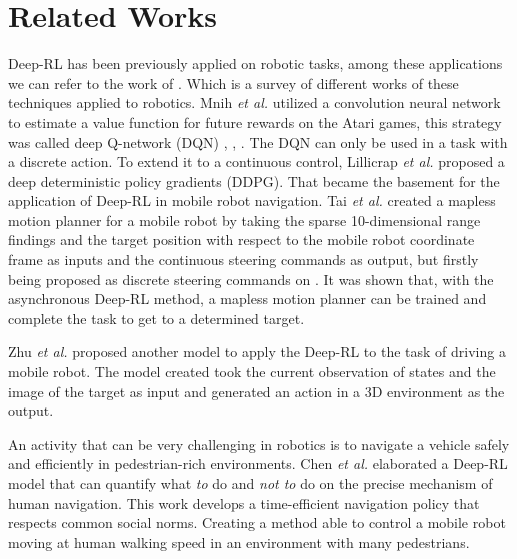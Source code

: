 \section{Related Works}

Deep-RL has been previously applied on robotic tasks, among these applications we can refer to the work of \cite{kober2013reinforcement}.
Which is a survey of different works of these techniques applied to robotics.
Mnih \textit{et al.} \cite{mnih2013playing} utilized a convolution neural network to estimate a value function for future rewards on the Atari games, this strategy was called deep Q-network (DQN) \cite{mnih2013playing}, \cite{hausknecht2015deep}, \cite{van2016deep}.
The DQN can only be used in a task with a discrete action.
To extend it to a continuous control, Lillicrap \textit{et al.} \cite{lillicrap2015continuous} proposed a deep deterministic policy gradients (DDPG).
That became the basement for the application of Deep-RL in mobile robot navigation.
Tai \textit{et al.} \cite{tai2017virtual} created a mapless motion planner for a mobile robot by taking the sparse 10-dimensional range findings and the target position with respect to the mobile robot coordinate frame as inputs and the continuous steering commands as output, but firstly being proposed as discrete steering commands on \cite{tai2016towards}. It was shown that, with the asynchronous Deep-RL method, a mapless motion planner can be trained and complete the task to get to a determined target. 

Zhu \textit{et al.} \cite{zhu2017target} proposed another model to apply the Deep-RL to the task of driving a mobile robot.
The model created took the current observation of states and the image of the target as input and generated an action in a 3D environment as the output.

An activity that can be very challenging in robotics is to navigate a vehicle safely and efficiently in pedestrian-rich environments. Chen \textit{et al.} \cite{chen2017socially} elaborated a Deep-RL model that can quantify what \textit{to} do and \textit{not to} do on the precise mechanism of human  navigation.
This work develops a time-efficient navigation policy that respects common social norms.
Creating a method able to control a mobile robot moving at human walking speed in an environment with many pedestrians.
